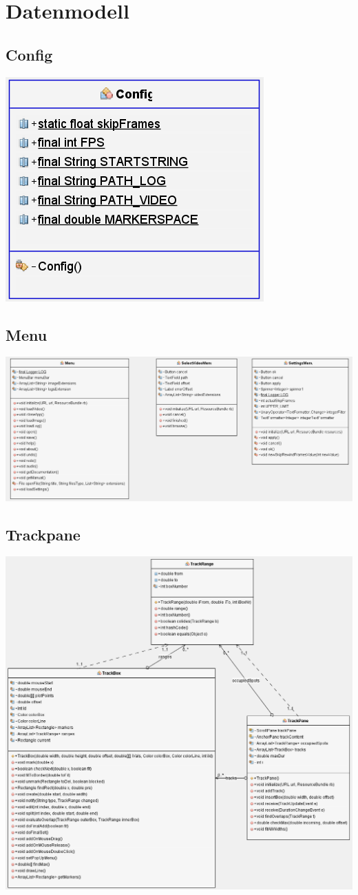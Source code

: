 \chapter{Datenmodell}
\section{Config}
\includegraphics[scale=0.6]{configUML}
\section{Menu}
\includegraphics[scale=0.45]{menuUML}
\section{Trackpane}
\includegraphics[scale=0.55]{trackUML}
